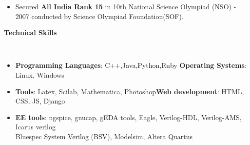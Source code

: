 \documentclass[a4paper,11pt]{article}
\newcommand{\lsep}{-0.5cm}
\newcommand{\resheading}[1]{{\small \colorbox{mygrey}{\begin{minipage}{0.975\textwidth}{\textbf{#1 \vphantom{p\^{E}}}}\end{minipage}}}}
\begin{document}
\begin{itemize}
  \item Secured \textbf{All India Rank 15} in 10th National Science Olympiad (NSO) - 2007 conducted by Science Olympiad Foundation(SOF).
\end{itemize}

\resheading{\textbf{\large Technical Skills}}\\[\lsep]
\begin{itemize}
   \item \textbf{Programming Languages}: C++,Java,Python,Ruby \hfill \textbf{Operating Systems}: Linux, Windows\\[-0.6cm]
   \item \textbf{Tools}: Latex, Scilab, Mathematica, Photoshop\hfill \textbf{Web development}: HTML, CSS, JS, Django\\[-0.6cm]
  \item \textbf{EE tools}: ngspice, gnucap,  gEDA tools, Eagle, Verilog-HDL, Verilog-AMS, Icarus verilog \\ \hspace*{1.5cm} Bluespec System Verilog (BSV), Modelsim, Altera Quartus
\end{itemize}
\end{document}
